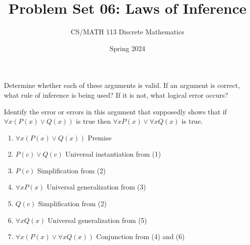 \documentclass[a4paper]{exam}
\title{Problem Set 06: Laws of Inference}
\author{CS/MATH 113 Discrete Mathematics}
\date{Spring 2024}
\begin{document}
\maketitle

\begin{questions}
 \question 
  Determine whether each of these arguments is valid. If an argument is correct, what rule of inference is being used? If it is not, what logical error occurs?

   
  \question  Identify the error or errors in this argument that supposedly shows that if $\forall x(P(x) \lor Q(x))$ is true then $\forall x P(x) \lor \forall x Q(x)$ is true.
\begin{enumerate}
    \item $\forall x(P(x) \lor Q(x))$ \hfill Premise
    \item $P(c) \lor Q(c)$ \hfill Universal instantiation from (1)
    \item $P(c)$ \hfill Simplification from (2)
    \item $\forall x P(x)$ \hfill Universal generalization from (3)
    \item $Q(c)$ \hfill Simplification from (2)
    \item $\forall x Q(x)$ \hfill Universal generalization from (5)
    \item $\forall x(P(x) \lor \forall x Q(x))$ \hfill Conjunction from (4) and (6)
\end{enumerate}
  \begin{solution}
  \end{solution}
  

\end{questions}
\end{document}
